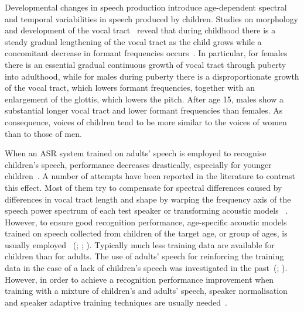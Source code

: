 \documentclass{nle}
\begin{document}
Developmental  changes in  speech  production introduce  age-dependent
spectral and  temporal variabilities  in speech produced  by children.
Studies    on    morphology    and    development   of    the    vocal
tract~\citep*{FitGie99} reveal that during  childhood there is a steady
gradual  lengthening of the  vocal tract  as the  child grows  while a
concomitant        decrease        in       formant        frequencies
occurs~\citep*{HubStaCurAshJoh99,LeePotNar99}.    In   particular,  for
females there is an essential gradual continuous growth of vocal tract
through puberty  into adulthood, while for males  during puberty there
is a disproportionate growth of  the vocal tract, which lowers formant
frequencies, together with an enlargement of the glottis, which lowers
the pitch. After  age 15, males show a  substantial longer vocal tract
and lower formant frequencies than females.  As consequence, voices of
children tend to be more similar  to the voices of women than to those
of men.

When an ASR system trained  on adults' speech is employed to recognise
children's speech,  performance decreases drastically,  especially for
younger children~\citep*{WilJac96,ClaDolBosCom98,DasNixPic98,LiRus01,GiuGer03,PotNar03,GerGiuBru07,Gerosa2009}.
A number of attempts have been reported in the literature to contrast this
effect.   Most of  them  try to  compensate  for spectral  differences
caused by differences  in vocal tract length and  shape by warping the
frequency axis  of the speech power  spectrum of each  test speaker or
transforming                      acoustic                      models
~\citep{ClaDolBosCom98,DasNixPic98,PotNar03}.     However,    to
ensure  good  recognition  performance, age-specific  acoustic  models trained on speech collected  from children of the target age, or
group        of         ages,        is        usually        employed
~(\citealp{WilJac96}; \citealp*{HagPelCol03,NisLeeSarShi04}; \citealp{GerGiuBru07}). Typically
much  less   training  data  are  available  for   children  than  for
adults. The use of adults' speech for reinforcing the training data in
the  case of  a  lack of  children's  speech was  investigated in  the
past~(\citealp{WilJac96}; \citealp*{SteSteHacNotNie03}).  However,  in order to achieve
a recognition performance improvement  when training with a mixture of
children's  and  adults'  speech,  speaker normalisation  and  speaker
adaptive      training      techniques are      usually  needed~\citep*{GerGiuBru09}.

\end{document}
